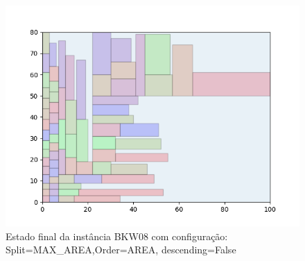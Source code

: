 \begin{figure}[H]
    \centering
    \caption[]{Estado final da instância BKW08 com configuração: Split=MAX_AREA,Order=AREA, descending=False}
    \label{fig:bkw08-max_area-area-false}
    \includegraphics[scale=0.5]{output/figures/bkw/bkw08/max_area/area/false/00}
\end{figure}